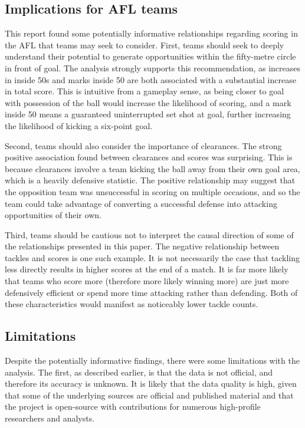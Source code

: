 \documentclass{article}
\begin{document}
\hypertarget{implications-for-afl-teams}{%
\subsection{Implications for AFL teams}\label{implications-for-afl-teams}}

This report found some potentially informative relationships regarding scoring in the AFL that teams may seek to consider. First, teams should seek to deeply understand their potential to generate opportunities within the fifty-metre circle in front of goal. The analysis strongly supports this recommendation, as increases in inside 50s and marks inside 50 are both associated with a substantial increase in total score. This is intuitive from a gameplay sense, as being closer to goal with possession of the ball would increase the likelihood of scoring, and a mark inside 50 means a guaranteed uninterrupted set shot at goal, further increasing the likelihood of kicking a six-point goal.

Second, teams should also consider the importance of clearances. The strong positive association found between clearances and scores was surprising. This is because clearances involve a team kicking the ball away from their own goal area, which is a heavily defensive statistic. The positive relationship may suggest that the opposition team was unsuccessful in scoring on multiple occasions, and so the team could take advantage of converting a successful defense into attacking opportunities of their own.

Third, teams should be cautious not to interpret the causal direction of some of the relationships presented in this paper. The negative relationship between tackles and scores is one such example. It is not necessarily the case that tackling less directly results in higher scores at the end of a match. It is far more likely that teams who score more (therefore more likely winning more) are just more defensively efficient or spend more time attacking rather than defending. Both of these characteristics would manifest as noticeably lower tackle counts.

\hypertarget{limitations}{%
\subsection{Limitations}\label{limitations}}

Despite the potentially informative findings, there were some limitations with the analysis. The first, as described earlier, is that the data is not official, and therefore its accuracy is unknown. It is likely that the data quality is high, given that some of the underlying sources are official and published material and that the project is open-source with contributions for numerous high-profile researchers and analysts.
\end{document}
